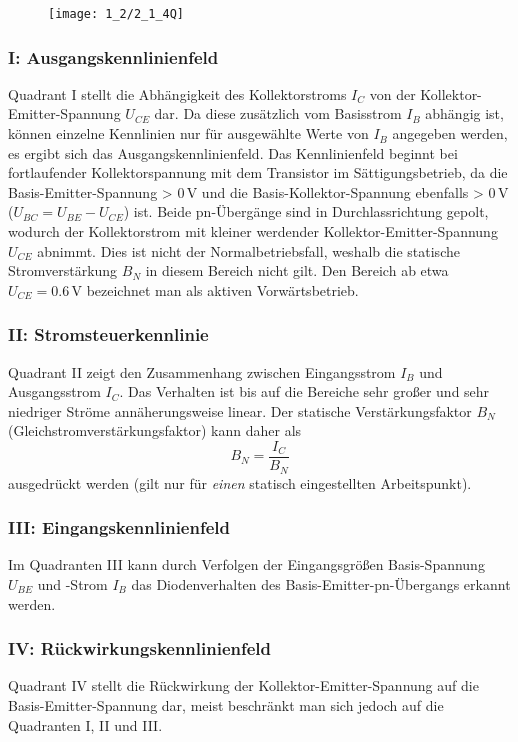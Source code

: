 
\begin{figure}[H]
 \begin{center}
   \texttt{[image: 1\_2/2\_1\_4Q]}
 \end{center}
\end{figure}
\subsubsection{I: Ausgangskennlinienfeld}
\textcolor{grape5}{Quadrant I} stellt die Abhängigkeit des Kollektorstroms $I_C$ von der
Kollektor-Emitter-Spannung $U_{CE}$ dar. Da diese zusätzlich vom
Basisstrom $I_B$ abhängig ist, können einzelne Kennlinien nur für ausgewählte Werte
von $I_B$ angegeben werden, es ergibt sich das Ausgangskennlinienfeld. Das
Kennlinienfeld beginnt bei fortlaufender Kollektorspannung mit dem Transistor im
Sättigungsbetrieb, da die Basis-Emitter-Spannung > $0 \, \si{\volt}$ und die
Basis-Kollektor-Spannung ebenfalls > $0 \, \si{\volt}$ ($U_{BC} = U_{BE} -
U_{CE}$) ist. Beide pn-Übergänge sind in Durchlassrichtung gepolt, wodurch der
Kollektorstrom mit kleiner werdender Kollektor-Emitter-Spannung $U_{CE}$
abnimmt. Dies ist nicht der Normalbetriebsfall, weshalb die statische Stromverstärkung
$B_N$ in diesem Bereich nicht gilt. Den Bereich ab etwa $U_{CE} = 0.6 \,
\si{\volt}$ bezeichnet man als aktiven Vorwärtsbetrieb.

\subsubsection{II: Stromsteuerkennlinie}
\textcolor{teal5}{Quadrant II} zeigt den Zusammenhang zwischen Eingangsstrom $I_B$
und Ausgangsstrom $I_C$. Das Verhalten ist bis auf die Bereiche sehr großer und
sehr niedriger Ströme annäherungsweise linear. Der statische Verstärkungsfaktor
$B_N$ (Gleichstromverstärkungsfaktor) kann daher als
\[B_N=\frac{I_C}{B_N}\]
ausgedrückt werden (gilt nur für \emph{einen} statisch eingestellten Arbeitspunkt).

\subsubsection{III: Eingangskennlinienfeld}
Im \textcolor{blue5}{Quadranten III} kann durch Verfolgen der Eingangsgrößen
Basis-Spannung $U_{BE}$ und -Strom $I_B$ das Diodenverhalten des
Basis-Emitter-pn-Übergangs erkannt werden.

\subsubsection{IV: Rückwirkungskennlinienfeld}
\textcolor{gray7}{Quadrant IV} stellt die Rückwirkung der
Kollektor-Emitter-Spannung auf die Basis-Emitter-Spannung dar, meist beschränkt
man sich jedoch auf die Quadranten I, II und III.
